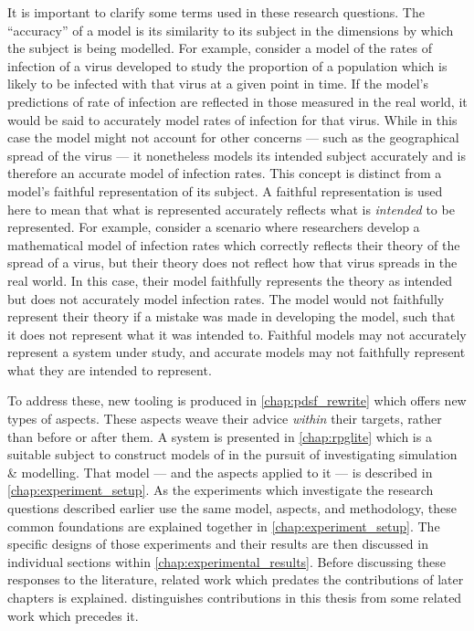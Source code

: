 It is important to clarify some terms used in these research questions. The
``accuracy'' of a model is its similarity to its subject in the dimensions by
which the subject is being modelled. For example, consider a model of the rates
of infection of a virus developed to study the proportion of a population which
is likely to be infected with that virus at a given point in time. If the
model's predictions of rate of infection are reflected in those measured in the
real world, it would be said to accurately model rates of infection for that
virus. While in this case the model might not account for other concerns ---
such as the geographical spread of the virus --- it nonetheless models its
intended subject accurately and is therefore an accurate model of infection
rates. This concept is distinct from a model's faithful representation of its
subject. A faithful representation is used here to mean that what is represented
accurately reflects what is \emph{intended} to be represented. For example,
consider a scenario where researchers develop a mathematical model of infection
rates which correctly reflects their theory of the spread of a virus, but their
theory does not reflect how that virus spreads in the real world. In this case,
their model faithfully represents the theory as intended but does not accurately
model infection rates. The model would not faithfully represent their theory if
a mistake was made in developing the model, such that it does not represent what
it was intended to. Faithful models may not accurately represent a system under
study, and accurate models may not faithfully represent what they are intended
to represent.

To address these, new tooling is produced in \cref{chap:pdsf_rewrite} which
offers new types of aspects. These aspects weave their advice \emph{within}
their targets, rather than before or after them. A system is presented in
\cref{chap:rpglite} which is a suitable subject to construct models of in the
pursuit of investigating \aspectoriented{} simulation \& modelling. That model
--- and the aspects applied to it --- is described in
\cref{chap:experiment_setup}. As the experiments which investigate the research
questions described earlier use the same model, aspects, and methodology, these
common foundations are explained together in \cref{chap:experiment_setup}. The
specific designs of those experiments and their results are then discussed in
individual sections within \cref{chap:experimental_results}. Before discussing
these responses to the literature, related work which predates the contributions
of later chapters is explained.  distinguishes
contributions in this thesis from some related work which precedes it.
